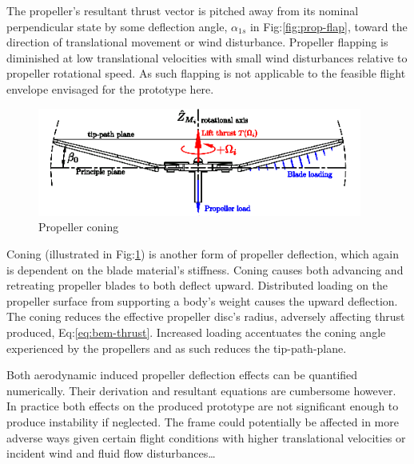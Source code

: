 \par
The propeller's resultant thrust vector is pitched away from its nominal perpendicular state by some deflection angle, $\alpha_{1s}$ in Fig:\ref{fig:prop-flap}, toward the direction of translational movement or wind disturbance. Propeller flapping is diminished at low translational velocities with small wind disturbances relative to propeller rotational speed. As such flapping is not applicable to the feasible flight envelope envisaged for the prototype here.
\par
\begin{figure}[hbtp]
\centering
\includegraphics[width=0.95\textwidth]{figs/prop-coning}
\caption{Propeller coning}
\label{fig:prop-coning}
\end{figure}
Coning (illustrated in Fig:\ref{fig:prop-coning}) is another form of propeller deflection, which again is dependent on the blade material's stiffness. Coning causes both advancing and retreating propeller blades to both deflect upward. Distributed loading on the propeller surface from supporting a body's weight causes the upward deflection. The coning reduces the effective propeller disc's radius, adversely affecting thrust produced, Eq:\ref{eq:bem-thrust}. Increased loading accentuates the coning angle experienced by the propellers and as such reduces the tip-path-plane.
\par
Both aerodynamic induced propeller deflection effects can be quantified numerically. Their derivation and resultant equations are cumbersome however. In practice both effects on the produced prototype are not significant enough to produce instability if neglected. The frame could potentially be affected in more adverse ways given certain flight conditions with higher translational velocities or incident wind and fluid flow disturbances\ldots
